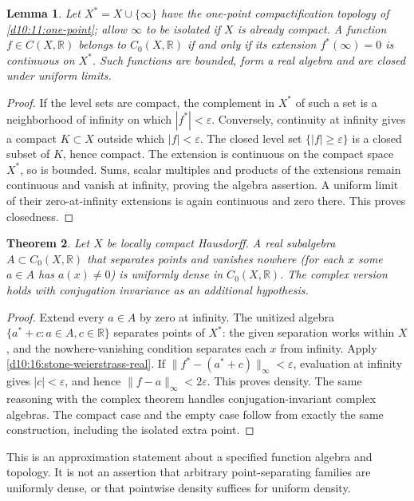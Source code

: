 \documentclass[11pt,oneside,openany]{book}
\newtheorem{theorem}{Theorem}[chapter]
\newtheorem{lemma}[theorem]{Lemma}
\theoremstyle{definition}
\theoremstyle{remark}
\newcommand{\R}{\mathbb R}\newcommand{\C}{\mathbb C}
\newcommand{\eps}{\varepsilon}
\newcommand{\norm}[1]{\lVert#1\rVert}
\begin{document}
\begin{lemma}\label{d10:16:c0-extension}
Let $X^*=X\cup\{\infty\}$ have the one-point compactification topology
of \cref{d10:11:one-point}; allow $\infty$ to be isolated if $X$ is
already compact. A function $f\in C(X,\R)$ belongs to $C_0(X,\R)$
if and only if its extension $f^*(\infty)=0$ is continuous on $X^*$.
Such functions are bounded, form a real algebra and are closed under uniform limits.
\end{lemma}
\begin{proof}
If the level sets are compact, the complement in $X^*$ of such a set
is a neighborhood of infinity on which $|f^*|<\eps$.
Conversely, continuity at infinity gives a compact $K\subset X$
outside which $|f|<\eps$. The closed level set
$\{|f|\geq\eps\}$ is a closed subset of $K$, hence compact.
The extension is continuous on the compact space $X^*$, so is bounded.
Sums, scalar multiples and products of the extensions remain continuous
and vanish at infinity, proving the algebra assertion.
A uniform limit of their zero-at-infinity extensions is again
continuous and zero there. This proves closedness.
\end{proof}

\begin{theorem}\label{d10:16:stone-weierstrass-c0}
Let $X$ be locally compact Hausdorff. A real subalgebra
$A\subset C_0(X,\R)$ that separates points and vanishes nowhere
(for each $x$ some $a\in A$ has $a(x)\ne0$) is uniformly dense in $C_0(X,\R)$.
The complex version holds with conjugation invariance as an additional hypothesis.
\end{theorem}
\begin{proof}
Extend every $a\in A$ by zero at infinity.
The unitized algebra $\{a^*+c:a\in A,c\in\R\}$ separates points
of $X^*$: the given separation works within $X$, and the nowhere-vanishing
condition separates each $x$ from infinity.
Apply \cref{d10:16:stone-weierstrass-real}.
If $\norm{f^*-(a^*+c)}_\infty<\eps$, evaluation at infinity gives
$|c|<\eps$, and hence $\norm{f-a}_\infty<2\eps$.
This proves density. The same reasoning with the complex theorem
handles conjugation-invariant complex algebras.
The compact case and the empty case follow from exactly the same
construction, including the isolated extra point.
\end{proof}

This is an approximation statement about a specified function algebra and
topology. It is not an assertion that arbitrary point-separating families
are uniformly dense, or that pointwise density suffices for uniform density.
\end{document}
